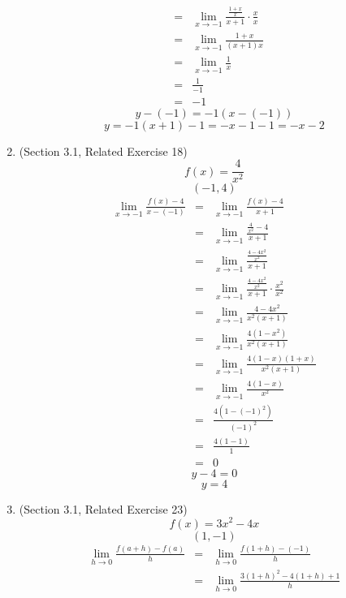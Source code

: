 \documentclass{article}
\begin{document}
\begin{enumerate}
\begin{eqnarray}
        &=& \lim_{x \to -1}{\frac{\frac{1+x}{x}}{x + 1} \cdot \frac{x}{x}} \\
        &=& \lim_{x \to -1}{\frac{1+x}{(x + 1)x}} \\
        &=& \lim_{x \to -1}{\frac{1}{x}} \\
        &=& \frac{1}{-1} \\
        &=& -1
    \end{eqnarray}
    $$y - (-1) = -1(x - (-1))$$
    $$y = -1(x + 1) - 1 = -x - 1 - 1 = -x - 2$$
    \item (Section 3.1, Related Exercise 18)
    $$f(x) = \frac{4}{x^2}$$
    $$(-1, 4)$$
    \begin{eqnarray}
        \lim_{x \to -1}{\frac{f(x) - 4}{x - (-1)}} &=& \lim_{x \to -1}{\frac{f(x) - 4}{x + 1}} \\
                                                 &=& \lim_{x \to -1}{\frac{\frac{4}{x^2} - 4}{x + 1}} \\
                                                 &=& \lim_{x \to -1}{\frac{\frac{4 - 4x^2}{x^2}}{x + 1}} \\
                                                 &=& \lim_{x \to -1}{\frac{\frac{4 - 4x^2}{x^2}}{x + 1} \cdot \frac{x^2}{x^2}} \\
                                                 &=& \lim_{x \to -1}{\frac{4 - 4x^2}{x^2(x + 1)}} \\
                                                 &=& \lim_{x \to -1}{\frac{4(1 - x^2)}{x^2(x + 1)}} \\
                                                 &=& \lim_{x \to -1}{\frac{4(1 - x)(1 + x)}{x^2(x + 1)}} \\
                                                 &=& \lim_{x \to -1}{\frac{4(1 - x)}{x^2}} \\
                                                 &=& \frac{4(1 - (-1)^2)}{(-1)^2} \\
                                                 &=& \frac{4(1 - 1)}{1} \\
                                                 &=& 0
    \end{eqnarray}
    $$y - 4 = 0$$
    $$y = 4$$
    \item (Section 3.1, Related Exercise 23)
    $$f(x) = 3x^2 - 4x$$
    $$(1, -1)$$
    \begin{eqnarray}
        \lim_{h \to 0}{\frac{f(a + h) - f(a)}{h}} &=& \lim_{h \to 0}{\frac{f(1 + h) - (-1)}{h}} \\
                                                &=& \lim_{h \to 0}{\frac{3(1 + h)^2 - 4(1 + h) +1}{h}} \\

\end{eqnarray}
\end{enumerate}
\end{document}
